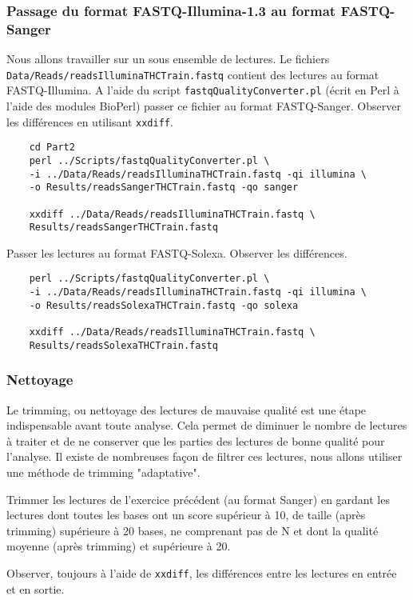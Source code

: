 \documentclass[a4paper,12pt]{article}
\begin{document}
\subsubsection{Passage du format FASTQ-Illumina-1.3 au format FASTQ-Sanger}
Nous allons travailler sur un sous ensemble de lectures. Le fichiers \verb=Data/Reads/readsIlluminaTHCTrain.fastq= contient des lectures au format FASTQ-Illumina. A l'aide du script \verb=fastqQualityConverter.pl= (écrit en Perl à l'aide des modules BioPerl) passer ce fichier au format FASTQ-Sanger. Observer les différences
en utilisant \verb=xxdiff=.
\begin{lstlisting}
	cd Part2
	perl ../Scripts/fastqQualityConverter.pl \
	-i ../Data/Reads/readsIlluminaTHCTrain.fastq -qi illumina \
	-o Results/readsSangerTHCTrain.fastq -qo sanger
	
	xxdiff ../Data/Reads/readsIlluminaTHCTrain.fastq \
	Results/readsSangerTHCTrain.fastq
\end{lstlisting}


Passer les lectures au format FASTQ-Solexa. Observer les différences.

\begin{lstlisting}
	perl ../Scripts/fastqQualityConverter.pl \
	-i ../Data/Reads/readsIlluminaTHCTrain.fastq -qi illumina \
	-o Results/readsSolexaTHCTrain.fastq -qo solexa
	
	xxdiff ../Data/Reads/readsIlluminaTHCTrain.fastq \
	Results/readsSolexaTHCTrain.fastq
\end{lstlisting}
	
	
\subsubsection{Nettoyage}
Le trimming, ou nettoyage des lectures de mauvaise qualité est une étape indispensable avant toute analyse. Cela permet de diminuer le nombre de lectures à traiter et de ne conserver que les parties des lectures de bonne qualité pour l'analyse. Il existe de nombreuses façon de filtrer ces lectures, nous allons utiliser une méthode de  trimming "adaptative".

Trimmer les lectures de l'exercice précédent (au format Sanger) en gardant les lectures dont toutes les bases ont  un score supérieur à 10, de taille (après trimming) supérieure à 20 bases, ne comprenant pas de N et dont la qualité moyenne (après trimming) et supérieure à 20. 

Observer, toujours à l'aide de \verb=xxdiff=, les différences entre les lectures en entrée et en sortie.
\end{document}
